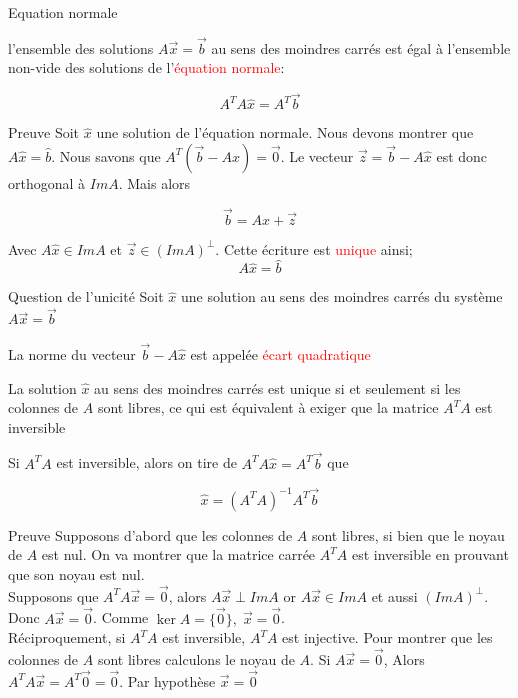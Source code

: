 \begin{parag}{Equation normale}
\begin{theoreme}
l'ensemble des solutions $A\vec{x} = \vec{b}$ au sens des moindres carrés est égal à l'ensemble non-vide des solutions de l'\textcolor{red}{équation normale}:
\begin{formule}
    \[A^TA\hat{x} = A^T\vec{b}\]
\end{formule}
\end{theoreme}
\begin{subparag}{Preuve}
    Soit $\hat{x}$ une solution de l'équation normale. Nous devons montrer que $A\hat{x} = \hat{b}$. Nous savons que $A^T(\vec{b} - A\hat{x}) = \vec{0}$. Le vecteur $\vec{z} = \vec{b} - A\hat{x}$ est donc orthogonal à $ImA$. Mais alors 
    \begin{formule}
        \[\vec{b}  = A\hat{x} + \vec{z}\]
    \end{formule}
    Avec $A\hat{x}\in ImA$ et $\vec{z} \in (ImA)^\perp$. Cette écriture est \textcolor{red}{unique} ainsi;
    \[A\hat{x} = \hat{b}\]
\end{subparag}
\end{parag}
\begin{parag}{Question de l'unicité}
    Soit $\hat{x}$ une solution au sens des moindres carrés du système $A\vec{x} = \vec{b}$
    \begin{definition}
        La norme du vecteur $\vec{b}-A\hat{x}$ est appelée \textcolor{red}{écart quadratique}
    \end{definition}
    \begin{theoreme}
        La solution $\hat{x}$ au sens des moindres carrés est unique si et seulement si les colonnes de $A$ sont libres, ce qui est équivalent à exiger que la matrice $A^TA$ est inversible
    \end{theoreme}
    Si $A^TA$ est inversible, alors on tire de $
    A^TA\hat{x} = A^T\vec{b}$ que 
    \begin{formule}
        \[\hat{x} = (A^TA)^{-1}A^T\vec{b}\]
    \end{formule}
    \begin{subparag}{Preuve}
        Supposons d'abord que les colonnes de $A$ sont libres, si bien que le noyau de $A$ est nul. On va montrer que la matrice carrée $A^TA$ est inversible en prouvant que son noyau est nul.
        \\
        Supposons que $A^TA\vec{x} = \vec{0}$, alors $A\vec{x} \perp ImA$ or $A\vec{x} \in ImA$ et aussi $(ImA)^\perp$. Donc $A\vec{x} = \vec{0}$. Comme $\ker A = \{\vec{0}\}, \; \vec{x} = \vec{0}$.
        \\
        Réciproquement, si $A^TA$ est inversible, $A^TA$ est injective. Pour montrer que les colonnes de $A$ sont libres calculons le noyau de $A$. Si $A\vec{x} = \vec{0}$, Alors $A^TA\vec{x} = A^T\vec{0} = \vec{0}$. Par hypothèse $\vec{x} = \vec{0}$
    \end{subparag}
\end{parag}
